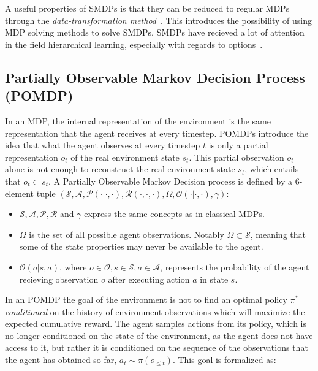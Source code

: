 \documentclass{../main.tex}{}
\begin{document}
A useful properties of SMDPs is that they can be reduced to regular MDPs through the \textit{data-transformation method}~\citep{Piunovskiy2012}. This introduces the possibility of using MDP solving methods to solve SMDPs. SMDPs have recieved a lot of attention in the field hierarchical learning, especially with regards to options~\citep{Sutton1998}.

\subsection{Partially Observable Markov Decision Process (POMDP)}
In an MDP, the internal representation of the environment is the same representation that the agent receives at every timestep. POMDPs introduce the idea that what the agent observes at every timestep $t$ is only a partial representation $o_t$ of the real environment state $s_t$. This partial observation $o_t$ alone is not enough to reconstruct the real environment state $s_t$, which entails that $o_t \subset s_t$. A Partially Observable Markov Decision process is defined by a 6-element tuple $(\mathcal{S}, \mathcal{A}, \mathcal{P}(\cdot | \cdot, \cdot), \mathcal{R}(\cdot, \cdot, \cdot), \Omega, \mathcal{O}(\cdot | \cdot, \cdot), \gamma)$:

\begin{itemize}
    \item $\mathcal{S}, \mathcal{A}, \mathcal{P}, \mathcal{R}$ and $\gamma$ express the same concepts as in classical MDPs.
    \item $\Omega$ is the set of all possible agent observations. Notably $\Omega \subset \mathcal{S}$, meaning that some of the state properties may never be available to the agent.
    \item $\mathcal{O}(o | s, a)$, where $o \in \mathcal{O}, s \in \mathcal{S}, a \in \mathcal{A}$, represents the probability of the agent recieving observation $o$ after executing action $a$ in state $s$. 
\end{itemize}

In an POMDP the goal of the environment is not to find an optimal policy $\pi^*$ \textit{conditioned} on the history of environment observations which will maximize the expected cumulative reward. The agent samples actions from its policy, which is no longer conditioned on the state of the environment, as the agent does not have access to it, but rather it is conditioned on the sequence of the observations that the agent has obtained so far, $a_t \sim \pi(o_{\leq t})$. This goal is formalized as:
\end{document}
